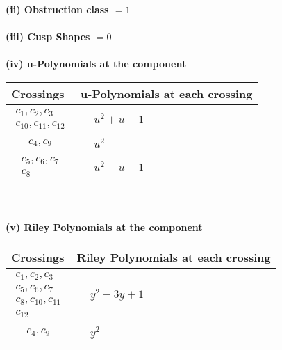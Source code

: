 \documentclass[1p]{elsarticle_modified}
\theoremstyle{definition}
\begin{document}
\flushleft \textbf{(ii) Obstruction class $= 1$}\\~\\
\flushleft \textbf{(iii) Cusp Shapes $= 0$}\\~\\
\newpage\renewcommand{\arraystretch}{1}
\flushleft \textbf{(iv) u-Polynomials at the component}\newline \\
\begin{tabular}{m{50pt}|m{274pt}}
Crossings & \hspace{64pt}u-Polynomials at each crossing \\
\hline $$\begin{aligned}c_{1},c_{2},c_{3}\\c_{10},c_{11},c_{12}\end{aligned}$$&$\begin{aligned}
&u^2+u-1
\end{aligned}$\\
\hline $$\begin{aligned}c_{4},c_{9}\end{aligned}$$&$\begin{aligned}
&u^2
\end{aligned}$\\
\hline $$\begin{aligned}c_{5},c_{6},c_{7}\\c_{8}\end{aligned}$$&$\begin{aligned}
&u^2- u-1
\end{aligned}$\\
\hline
\end{tabular}\\~\\
\newpage\renewcommand{\arraystretch}{1}
\flushleft \textbf{(v) Riley Polynomials at the component}\newline \\
\begin{tabular}{m{50pt}|m{274pt}}
Crossings & \hspace{64pt}Riley Polynomials at each crossing \\
\hline $$\begin{aligned}c_{1},c_{2},c_{3}\\c_{5},c_{6},c_{7}\\c_{8},c_{10},c_{11}\\c_{12}\end{aligned}$$&$\begin{aligned}
&y^2-3 y+1
\end{aligned}$\\
\hline $$\begin{aligned}c_{4},c_{9}\end{aligned}$$&$\begin{aligned}
&y^2
\end{aligned}$\\
\hline
\end{tabular}\\~\\
\end{document}
